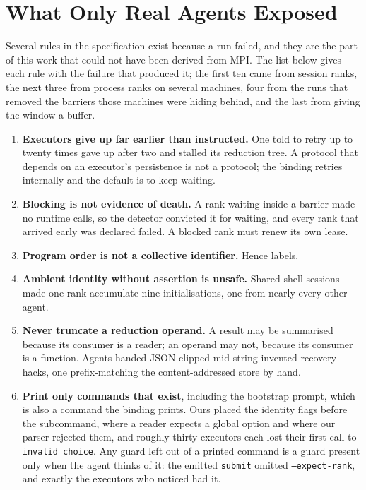 \documentclass[sigconf,nonacm]{acmart}
\newcommand{\code}[1]{\texttt{\small #1}}
\begin{document}




\section{What Only Real Agents Exposed}
\label{sec:lessons}

Several rules in the specification exist because a run failed, and they are the
part of this work that could not have been derived from MPI. The list below
gives each rule with the failure that produced it; the first ten came from
session ranks, the next three from process ranks on several machines, four
from the runs that removed the barriers those machines were hiding behind, and
the last from giving the window a buffer.

\begin{enumerate}
\item \textbf{Executors give up far earlier than instructed.} One told to retry
up to twenty times gave up after two and stalled its reduction tree. A protocol
that depends on an executor's persistence is not a protocol; the binding retries
internally and the default is to keep waiting.

\item \textbf{Blocking is not evidence of death.} A rank waiting inside a barrier
made no runtime calls, so the detector convicted it for waiting, and every rank
that arrived early was declared failed. A blocked rank must renew its own lease.

\item \textbf{Program order is not a collective identifier.} Hence labels.

\item \textbf{Ambient identity without assertion is unsafe.} Shared shell
sessions made one rank accumulate nine initialisations, one from nearly every
other agent.

\item \textbf{Never truncate a reduction operand.} A result may be summarised
because its consumer is a reader; an operand may not, because its consumer is a
function. Agents handed JSON clipped mid-string invented recovery hacks, one
prefix-matching the content-addressed store by hand.

\item \textbf{Print only commands that exist}, including the bootstrap prompt,
which is also a command the binding prints. Ours placed the identity flags before
the subcommand, where a reader expects a global option and where our parser
rejected them, and roughly thirty executors each lost their first call to
\code{invalid choice}. Any guard left out of a printed command is a guard present
only when the agent thinks of it: the emitted \code{submit} omitted
\code{--expect-rank}, and exactly the executors who noticed had it.


\end{enumerate}
\end{document}
